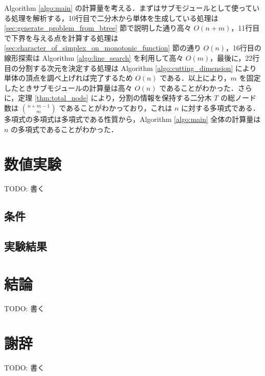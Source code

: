 \documentclass[a4paper,11pt]{jreport}
\begin{document}
Algorithm \ref{algo:main} の計算量を考える．まずはサブモジュールとして使っている処理を解析する，10行目で二分木から単体を生成している処理は \ref{sec:generate_problem_from_btree} 節で説明した通り高々 $ O(n + m) $，11行目で下界を与える点を計算する処理は \ref{sec:character_of_simplex_on_monotonic_function} 節の通り $ O(n) $，16行目の線形探索は Algorithm \ref{algo:line_search} を利用して高々 $ O(m) $，最後に，22行目の分割する次元を決定する処理は Algorithm \ref{algo:cutting_dimension} により単体の頂点を調べ上げれば完了するため $ O(n) $ である．以上により，$ m $ を固定したときサブモジュールの計算量は高々 $ O(n) $ であることがわかった．さらに，定理 \ref{thm:total_node} により，分割の情報を保持する二分木 $ T $ の総ノード数は $ \binom{n + m - 1}{m} $ であることがわかっており，これは $ n $ に対する多項式である．多項式の多項式は多項式である性質から，Algorithm \ref{algo:main} 全体の計算量は $ n $ の多項式であることがわかった．\par

\chapter{数値実験}

TODO: 書く
\section{条件}
\section{実験結果}

\chapter{結論}

TODO: 書く

\chapter*{謝辞}

TODO: 書く

\newpage

\renewcommand{\bibname}{参考文献}
\end{document}
